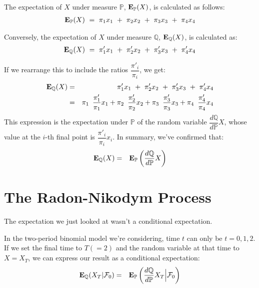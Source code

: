 \documentclass[uplatex,a4j,12pt,dvipdfmx]{jsarticle}
\begin{document}
The expectation of $X$ under measure $\mathbb{P}$, ${\bf E}_{\mathbb{P}}(X)$, is calculated as follows:
%
\begin{eqnarray*}
	{\bf E}_{\mathbb{P}}(X)
	\ = \
	\pi_{1} x_{1}
	\ + \
	\pi_{2} x_{2}
	\ + \
	\pi_{3} x_{3}
	\ + \
	\pi_{4} x_{4}
\end{eqnarray*}
%

Conversely, the expectation of $X$ under measure $\mathbb{Q}$, ${\bf E}_{\mathbb{Q}}(X)$, is calculated as:
%
\begin{eqnarray*}
	{\bf E}_{\mathbb{Q}}(X)
	\ = \
	\pi'_{1} x_{1}
	\ + \
	\pi'_{2} x_{2}
	\ + \
	\pi'_{3} x_{3}
	\ + \
	\pi'_{4} x_{4}
\end{eqnarray*}
%

If we rearrange this to include the ratios $\dfrac{ \pi'_{i} }{ \pi_{i} }$, we get:
%
\begin{eqnarray*}
	{\bf E}_{\mathbb{Q}}(X)
	&=&
	\pi'_{1} x_{1}
	\ + \
	\pi'_{2} x_{2}
	\ + \
	\pi'_{3} x_{3}
	\ + \
	\pi'_{4} x_{4}
	\\ &=&
	\pi_{1}
	\ \ \!
	\dfrac{ \pi'_{1} }{ \pi_{1} }
	x_{1}
	+
	\pi_{2}
	\ \ \!
	\dfrac{ \pi'_{2} }{ \pi_{2} }
	x_{2}
	+
	\pi_{3}
	\ \ \!
	\dfrac{ \pi'_{3} }{ \pi_{3} }
	x_{3}
	+
	\pi_{4}
	\ \ \!
	\dfrac{ \pi'_{4} }{ \pi_{4} }
	x_{4}
\end{eqnarray*}
%
This expression is the expectation under $\mathbb{P}$ of the random variable $
	\dfrac{ d \mathbb{Q} }{ d \mathbb{P} } X
$, whose value at the $i$-th final point is $
	\dfrac{ \pi'_{i} }{ \pi_{i} }
	x_{i}
$.
In summary, we've confirmed that:
%
\begin{eqnarray*}
	{\bf E}_{\mathbb{Q}}(X)
	&=&
	{\bf E}_{\mathbb{P}}
	\left(
	\dfrac{ d \mathbb{Q} }{ d \mathbb{P} }
	X
	\right)
\end{eqnarray*}
%

\section{The Radon-Nikodym Process}

The expectation we just looked at wasn't a conditional expectation.

In the two-period binomial model we're considering, time $t$ can only be $t=0,1,2$. If we set the final time to $T(=2)$ and the random variable at that time to $X=X_{T}$, we can express our result as a conditional expectation:
%
\begin{eqnarray*}
	{\bf E}_{\mathbb{Q}}(X_{T} | \mathcal{F}_{0} )
	&=&
	{\bf E}_{\mathbb{P}}
	\left(
	\dfrac{ d \mathbb{Q} }{ d \mathbb{P} }
	X_{T} \Big| \mathcal{F}_{0}
	\right)
\end{eqnarray*}
%
\end{document}
